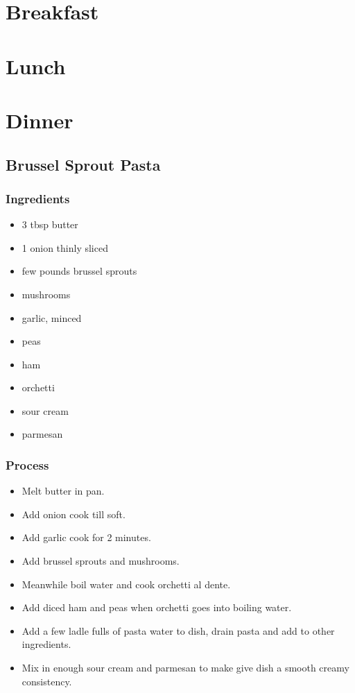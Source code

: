 \documentclass{article}
\begin{document}
\pagecolor[HTML]{1a1b26}
\color[HTML]{9aa5ce}
\setlength{\voffset}{-0.75in}
\setlength{\headsep}{5pt}
\section*{Breakfast}
\section*{Lunch}
\section*{Dinner}
\subsection*{Brussel Sprout Pasta}
\subsubsection*{Ingredients}
\begin{itemize}
    \item 3 tbsp butter
    \item 1 onion thinly sliced
    \item few pounds brussel sprouts 
    \item mushrooms
    \item garlic, minced
    \item peas
    \item ham
    \item orchetti 
    \item sour cream
    \item parmesan
\end{itemize}
\subsubsection*{Process}
\begin{itemize}
    \item Melt butter in pan.
    \item Add onion cook till soft.
    \item Add garlic cook for 2 minutes.
    \item Add brussel sprouts and mushrooms.
    \item Meanwhile boil water and cook orchetti al dente.
    \item Add diced ham and peas when orchetti goes into boiling water.
    \item Add a few ladle fulls of pasta water to dish, drain pasta and add to other ingredients.
    \item Mix in enough sour cream and parmesan to make give dish a smooth creamy consistency.
\end{itemize}
\end{document}
